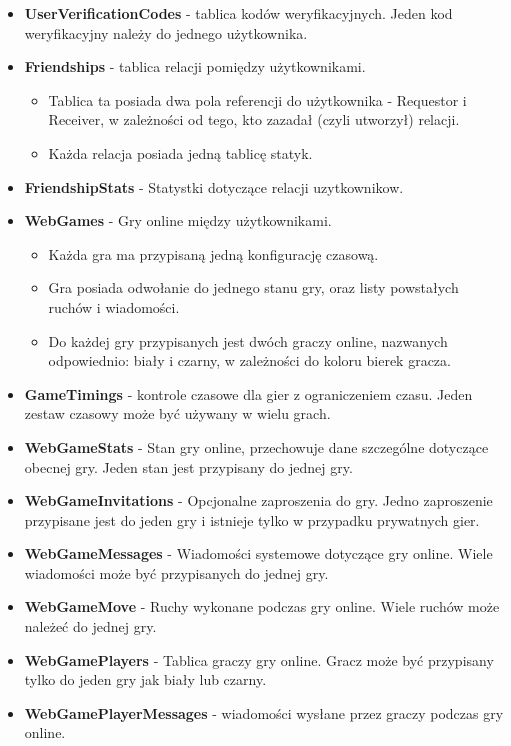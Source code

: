 \documentclass[12pt,a4paper]{article}
\begin{document}
\begin{itemize}
    \item \textbf{UserVerificationCodes} - tablica kodów weryfikacyjnych. Jeden kod weryfikacyjny należy do jednego użytkownika.
    \item \textbf{Friendships} - tablica relacji pomiędzy użytkownikami.
    \begin{itemize}
        \item Tablica ta posiada dwa pola referencji do użytkownika - Requestor i Receiver, w zależności od tego, kto zazadał (czyli utworzył) relacji.
        \item Każda relacja posiada jedną tablicę statyk.
    \end{itemize}
    \item \textbf{FriendshipStats} - Statystki dotyczące relacji uzytkownikow.
    \item \textbf{WebGames} - Gry online między użytkownikami.
    \begin{itemize}
        \item Każda gra ma przypisaną jedną konfigurację czasową.
        \item Gra posiada odwołanie do jednego stanu gry, oraz listy powstałych ruchów i  wiadomości.
        \item Do każdej gry przypisanych jest dwóch graczy online, nazwanych odpowiednio: biały i czarny, w zależności do koloru bierek gracza.
    \end{itemize}
    \item \textbf{GameTimings} - kontrole czasowe dla gier z ograniczeniem czasu. Jeden zestaw czasowy może być używany w wielu grach.
    \item \textbf{WebGameStats} - Stan gry online, przechowuje dane szczególne dotyczące obecnej gry. Jeden stan jest przypisany do jednej gry.
    \item \textbf{WebGameInvitations} - Opcjonalne zaproszenia do gry. Jedno zaproszenie przypisane jest do jeden gry i istnieje tylko w przypadku prywatnych gier.
    \item \textbf{WebGameMessages} - Wiadomości systemowe dotyczące gry online. Wiele wiadomości może być przypisanych do jednej gry.
    \item \textbf{WebGameMove} - Ruchy wykonane podczas gry online. Wiele ruchów może należeć do jednej gry.
    \item \textbf{WebGamePlayers} - Tablica graczy gry online. Gracz może być przypisany tylko do jeden gry jak biały lub czarny.
    \item \textbf{WebGamePlayerMessages} - wiadomości wysłane przez graczy podczas gry online.

\end{itemize}
\end{document}
